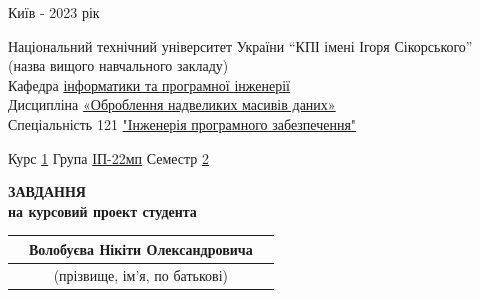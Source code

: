 \documentclass[14pt]{article}
\begin{document}
\vspace*{\fill}
\begin{center}
Київ - 2023 рік
\end{center}

\thispagestyle{empty}

\pagebreak

\begin{center}
\fontsize{14}{17}\selectfont
Національний технічний університет України “КПІ імені Ігоря Сікорського”\\
\fontsize{12}{14}\selectfont
(назва вищого навчального закладу)\\
Кафедра \underline{інформатики та програмної інженерії}\\
Дисципліна \underline{«Оброблення надвеликих масивів даних»}\\
Спеціальність 121 \underline{"Інженерія програмного забезпечення"}\\
\end{center}
Курс \underline{\hspace{1em}1\hspace{1em}} Група \underline{\hspace{1em}ІП-22мп\hspace{1em}} \hfill Семестр \underline{\hspace{0.5em}2\hspace{0.5em}}\\

\fontsize{14}{17}\selectfont
\begin{center}
\textbf{ЗАВДАННЯ}\\
\textbf{на курсовий проект студента}\\

\begin{tabularx}{\textwidth}{X c X}
    & Волобуєва Нікіти Олександровича &\\
    \hline
    & \fontsize{9}{11}\selectfont (прізвище, ім’я, по батькові) &
\end{tabularx}
\end{center}
\end{document}
